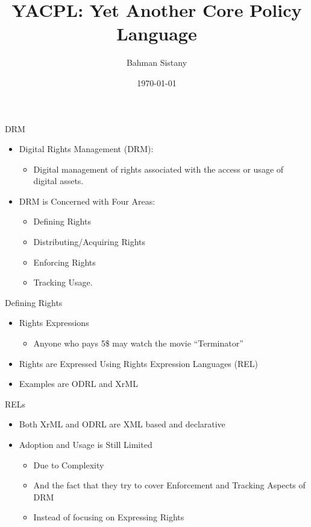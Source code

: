 \documentclass{beamer}
\title{YACPL: Yet Another Core Policy Language}
\author{Bahman Sistany}
\date{\today}
\begin{document}
\begin{frame}
\titlepage
\end{frame}

\begin{frame}{DRM}
\begin{itemize}
   \item Digital Rights Management (DRM):
   \begin{itemize}
      \item Digital management of rights associated with the access or usage of digital assets.
   \end{itemize}
   \item DRM is Concerned with Four Areas:
     \begin{itemize}
	\item Defining Rights
	\item Distributing/Acquiring Rights
	\item Enforcing Rights
	\item Tracking Usage.
     \end{itemize}
\end{itemize}
\end{frame}
\begin{frame}[fragile]{Defining Rights}
\LARGE
\begin{itemize}
\item Rights Expressions
   \begin{itemize}
   \item Anyone who pays 5\$ may watch the movie ``Terminator''
   \end{itemize}
\item Rights are Expressed Using Rights Expression Languages (REL)
\item Examples are ODRL and XrML
\end{itemize}
\end{frame}
\begin{frame}[fragile]{RELs}
\LARGE
\begin{itemize}
\item Both XrML and ODRL are XML based and declarative
\item Adoption and Usage is Still Limited
   \begin{itemize}
   \item Due to Complexity 
   \item And the fact that they try to cover Enforcement and Tracking Aspects of DRM
   \item Instead of focusing on Expressing Rights
   \end{itemize}
\end{itemize}
\end{frame}
\end{document}

